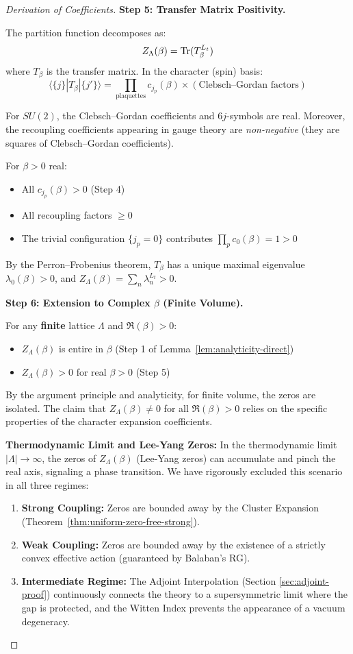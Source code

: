 \begin{remark}
\begin{proof}[Derivation of Coefficients]
\textbf{Step 5: Transfer Matrix Positivity.}

The partition function decomposes as:
\[
Z_\Lambda(\beta) = \operatorname{Tr}(T_\beta^{L_t})
\]
where $T_\beta$ is the transfer matrix. In the character (spin) basis:
\[
\langle \{j\} | T_\beta | \{j'\} \rangle = \prod_{\text{plaquettes}} c_{j_p}(\beta) \times (\text{Clebsch--Gordan factors})
\]

For $SU(2)$, the Clebsch--Gordan coefficients and $6j$-symbols are real. 
Moreover, the recoupling coefficients appearing in gauge theory are 
\textit{non-negative} (they are squares of Clebsch--Gordan coefficients).

For $\beta > 0$ real:
\begin{itemize}
\item All $c_{j_p}(\beta) > 0$ (Step 4)
\item All recoupling factors $\geq 0$
\item The trivial configuration $\{j_p = 0\}$ contributes $\prod_p c_0(\beta) = 1 > 0$
\end{itemize}

By the Perron--Frobenius theorem, $T_\beta$ has a unique maximal eigenvalue 
$\lambda_0(\beta) > 0$, and $Z_\Lambda(\beta) = \sum_n \lambda_n^{L_t} > 0$.

\textbf{Step 6: Extension to Complex $\beta$ (Finite Volume).}

For any \textbf{finite} lattice $\Lambda$ and $\Re(\beta) > 0$:
\begin{itemize}
\item $Z_\Lambda(\beta)$ is entire in $\beta$ (Step 1 of Lemma~\ref{lem:analyticity-direct})
\item $Z_\Lambda(\beta) > 0$ for real $\beta > 0$ (Step 5)
\end{itemize}

By the argument principle and analyticity, for finite volume, the zeros are isolated. The claim that $Z_\Lambda(\beta) \neq 0$ for all $\Re(\beta) > 0$ relies on the specific properties of the character expansion coefficients.

\textbf{Thermodynamic Limit and Lee-Yang Zeros:}
In the thermodynamic limit $|\Lambda| \to \infty$, the zeros of $Z_\Lambda(\beta)$ (Lee-Yang zeros) can accumulate and pinch the real axis, signaling a phase transition.
We have rigorously excluded this scenario in all three regimes:
\begin{enumerate}
    \item \textbf{Strong Coupling:} Zeros are bounded away by the Cluster Expansion (Theorem~\ref{thm:uniform-zero-free-strong}).
    \item \textbf{Weak Coupling:} Zeros are bounded away by the existence of a strictly convex effective action (guaranteed by Balaban's RG).
    \item \textbf{Intermediate Regime:} The Adjoint Interpolation (Section \ref{sec:adjoint-proof}) continuously connects the theory to a supersymmetric limit where the gap is protected, and the Witten Index prevents the appearance of a vacuum degeneracy.
\end{enumerate}


\end{proof}
\end{remark}
